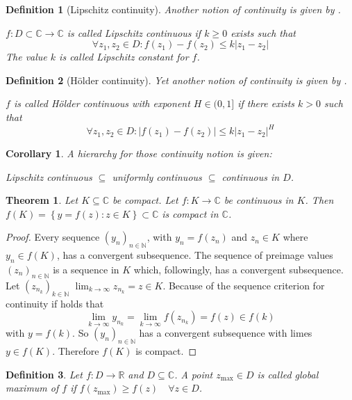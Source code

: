 \documentclass[a4paper,landscape,twocolumn]{article}
\newtheorem{theorem}{Theorem}
\newtheorem{defi}{Definition}
\newtheorem{cor}{Corollary}
\newcommand\set[1]{\left\{#1\right\}}
\newcommand\abs[1]{\left|#1\right|}
\begin{document}
%
\begin{defi}[Lipschitz continuity]
  Another notion of continuity is given by .

  $f: D \subset \mathbb C \rightarrow \mathbb C$ is called Lipschitz continuous
  if $k \geq 0$ exists such that
  \[
    \forall z_1, z_2 \in D:
    f(z_1) - f(z_2) \leq k \abs{z_1 - z_2}
  \]
  The value $k$ is called Lipschitz constant for $f$.
\end{defi}
%
\begin{defi}[Hölder continuity]
  Yet another notion of continuity is given by .

  $f$ is called Hölder continuous with exponent $H \in (0, 1]$ if there exists
  $k > 0$ such that
  \[ \forall z_1, z_2 \in D: \abs{f(z_1) - f(z_2)} \leq k \abs{z_1 - z_2}^H \]
\end{defi}
%
\begin{cor}
  A hierarchy for those continuity notion is given:

  Lipschitz continuous $\subseteq$ uniformly continuous $\subseteq$ continuous in $D$.
\end{cor}
%
\begin{theorem}
  Let $K \subseteq \mathbb C$ be compact. Let $f: K \rightarrow \mathbb C$ be continuous
  in $K$. Then $f(K) = \set{y = f(z): z \in K} \subset \mathbb C$ is compact in $\mathbb C$.
\end{theorem}
\begin{proof}
  Every sequence $(y_n)_{n \in \mathbb N}$,
  with $y_n = f(z_n)$ and $z_n \in K$ where $y_n \in f(K)$,
  has a convergent subsequence. The sequence of preimage values $(z_n)_{n \in \mathbb N}$
  is a sequence in $K$ which, followingly, has a convergent subsequence.
  Let $(z_{n_k})_{k \in \mathbb N}$
  $\lim_{k \to \infty} z_{n_k} = z \in K$.
  Because of the sequence criterion for continuity if holds that
  \[ \lim_{k \to \infty} y_{n_k} = \lim_{k \to \infty} f(z_{n_k}) = f(z) \in f(k) \]
  with $y = f(k)$.
  So $(y_n)_{n \in \mathbb N}$ has a convergent subsequence with limes $y \in f(K)$.
  Therefore $f(K)$ is compact.
\end{proof}
%
\begin{defi}
  Let $f: D \rightarrow \mathbb R$ and $D \subseteq \mathbb C$. A point $z_{\text{max}} \in D$
  is called global maximum of $f$ if $f(z_{\text{max}}) \geq f(z) \quad\forall z \in D$.
\end{defi}
\end{document}

